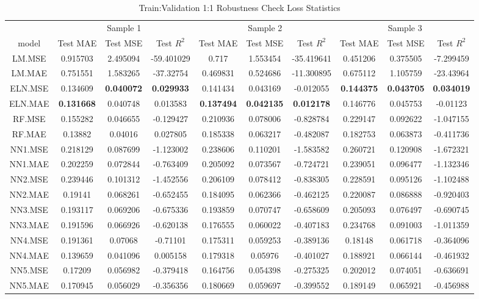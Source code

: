 \begin{table}

\caption{\label{tab:}Train:Validation 1:1 Robustness Check Loss Statistics}
\centering
\fontsize{6}{8}\selectfont
\begin{tabular}[t]{cccccccccc}
\toprule
\multicolumn{1}{c}{ } & \multicolumn{3}{c}{Sample 1} & \multicolumn{3}{c}{Sample 2} & \multicolumn{3}{c}{Sample 3} \\
\cmidrule(l{3pt}r{3pt}){2-4} \cmidrule(l{3pt}r{3pt}){5-7} \cmidrule(l{3pt}r{3pt}){8-10}
model & Test MAE & Test MSE & Test $R^2$ & Test MAE & Test MSE & Test $R^2$ & Test MAE & Test MSE & Test $R^2$\\
\midrule
LM.MSE & 0.915703 & 2.495094 & -59.401029 & 0.717 & 1.553454 & -35.419641 & 0.451206 & 0.375505 & -7.299459\\
LM.MAE & 0.751551 & 1.583265 & -37.32754 & 0.469831 & 0.524686 & -11.300895 & 0.675112 & 1.105759 & -23.43964\\
ELN.MSE & 0.134609 & \textbf{0.040072} & \textbf{0.029933} & 0.141434 & 0.043169 & -0.012055 & \textbf{0.144375} & \textbf{0.043705} & \textbf{0.034019}\\
ELN.MAE & \textbf{0.131668} & 0.040748 & 0.013583 & \textbf{0.137494} & \textbf{0.042135} & \textbf{0.012178} & 0.146776 & 0.045753 & -0.01123\\
RF.MSE & 0.155282 & 0.046655 & -0.129427 & 0.210936 & 0.078006 & -0.828784 & 0.229147 & 0.092622 & -1.047155\\
RF.MAE & 0.13882 & 0.04016 & 0.027805 & 0.185338 & 0.063217 & -0.482087 & 0.182753 & 0.063873 & -0.411736\\
NN1.MSE & 0.218129 & 0.087699 & -1.123002 & 0.238606 & 0.110201 & -1.583582 & 0.260721 & 0.120908 & -1.672321\\
NN1.MAE & 0.202259 & 0.072844 & -0.763409 & 0.205092 & 0.073567 & -0.724721 & 0.239051 & 0.096477 & -1.132346\\
NN2.MSE & 0.239446 & 0.101312 & -1.452556 & 0.206109 & 0.078412 & -0.838305 & 0.228591 & 0.095126 & -1.102488\\
NN2.MAE & 0.19141 & 0.068261 & -0.652455 & 0.184095 & 0.062366 & -0.462125 & 0.220087 & 0.086888 & -0.920403\\
NN3.MSE & 0.193117 & 0.069206 & -0.675336 & 0.193859 & 0.070747 & -0.658609 & 0.205093 & 0.076497 & -0.690745\\
NN3.MAE & 0.191596 & 0.066926 & -0.620138 & 0.176555 & 0.060022 & -0.407183 & 0.234768 & 0.091003 & -1.011359\\
NN4.MSE & 0.191361 & 0.07068 & -0.71101 & 0.175311 & 0.059253 & -0.389136 & 0.18148 & 0.061718 & -0.364096\\
NN4.MAE & 0.139659 & 0.041096 & 0.005158 & 0.179318 & 0.05976 & -0.401027 & 0.188921 & 0.066144 & -0.461932\\
NN5.MSE & 0.17209 & 0.056982 & -0.379418 & 0.164756 & 0.054398 & -0.275325 & 0.202012 & 0.074051 & -0.636691\\
NN5.MAE & 0.170945 & 0.056029 & -0.356356 & 0.180669 & 0.059697 & -0.399552 & 0.189149 & 0.065921 & -0.456988\\
\bottomrule
\end{tabular}
\end{table}